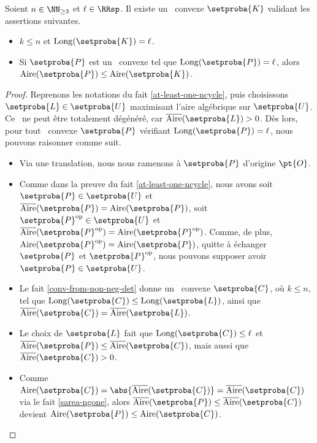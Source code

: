 \begin{fact} \label{at-least-one-kgone}
    Soient $n \in \NN_{\geq3}$ et $\ell \in \RRsp$.
    Il existe un \kgone\ convexe $\setproba{K}$ validant les assertions suivantes.
	\begin{itemize}
		\item $k \leq n$ et $\cyclelen{\setproba{K}} = \ell$.

		\item Si $\setproba{P}$ est un \ngone\ convexe tel que $\cyclelen{\setproba{P}} = \ell$, alors $\area{\setproba{P}} \leq \area{\setproba{K}}$.
    \end{itemize}
\end{fact}


\begin{proof}
    Reprenons les notations du fait \ref{at-least-one-ncycle}, puis 
    choisissons $\setproba{L} \in \setproba{U}$ maximisant l'aire algébrique sur $\setproba{U}$.
    Ce \ncycle\ ne peut être totalement dégénéré, car $\sarea{\setproba{L}} > 0$.
    Dès lors, pour tout \ngone\ convexe $\setproba{P}$ vérifiant $\cyclelen{\setproba{P}} = \ell$, nous pouvons raisonner comme suit. 
	\begin{itemize}
		\item Via une translation, nous nous ramenons à $\setproba{P}$ d'origine $\pt{O}$.


		\item Comme dans la preuve du fait \ref{at-least-one-ncycle}, nous avons
		soit $\setproba{P} \in \setproba{U}$ et $\sarea{\setproba{P}} = \area{\setproba{P}}$,
		soit $\setproba{P}^{\mathrm{op}} \in \setproba{U}$ et $\sarea{\setproba{P}^{\mathrm{op}}} = \area{\setproba{P}^{\mathrm{op}}}$.
		Comme, de plus, $\area{\setproba{P}^{\mathrm{op}}} = \area{\setproba{P}}$,
		quitte à échanger $\setproba{P}$ et $\setproba{P}^{\mathrm{op}}$,
		nous pouvons supposer avoir $\setproba{P} \in \setproba{U}$.


		\item Le fait \ref{conv-from-non-neg-det} donne un \kgone\ convexe $\setproba{C}$, où $k \leq n$, tel que
		$\cyclelen{\setproba{C}} \leq \cyclelen{\setproba{L}}$,
		ainsi que
		$\sarea{\setproba{C}} = \sarea{\setproba{L}}$.


		\item Le choix de $\setproba{L}$ fait que 
		$\cyclelen{\setproba{C}} \leq \ell$
		et
		$\sarea{\setproba{P}} \leq \sarea{\setproba{C}}$,
		mais aussi que
		$\sarea{\setproba{C}} > 0$.


		\item Comme
		$\area{\setproba{C}} = \abs{\sarea{\setproba{C}}} = \sarea{\setproba{C}}$
		via le fait \ref{sarea-ngone},
		alors
		$\sarea{\setproba{P}} \leq \sarea{\setproba{C}}$
		devient
		$\area{\setproba{P}} \leq \area{\setproba{C}}$.



\end{itemize}
\end{proof}
